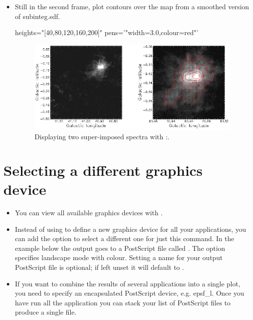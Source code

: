 \documentclass[11pt,oneside,chapters]{starlink}
\begin{document}
\begin{itemize}
\item Still in the second frame, plot contours over the map from a smoothed version of subinteg.sdf.
\begin{terminalv}
  heights="[40,80,120,160,200]" pens='"width=3.0,colour=red"'
\end{terminalv}

\begin{figure}[h!]
\begin{center}
\includegraphics[width=0.8\linewidth]{sc20_display8}
\caption[Displaying two super-imposed spectra with \Kappa:\linplot.]{\label{fig:display8}
  Displaying two super-imposed spectra with \Kappa:\linplot.}
\end{center}
\end{figure}

\end{itemize}

\section{Selecting a different graphics device}

\begin{itemize}
\item You can view all available graphics devices with .
\begin{terminalv}
\end{terminalv}

\item Instead of using  to define a new graphics device
for all your applications, you can add the  option to
select a different one for just this command. In the example below the
output goes to a PostScript file called . The option
 specifies landscape mode with colour. Setting a name
for your output PostScript file is optional; if left unset it will default to
.
\begin{terminalv}
\end{terminalv}

\item If you want to combine the results of several applications into
a single plot, you need to specify an encapsulated PostScript device,
e.g. epsf\_l. Once you have run all the application you can stack your
list of PostScript files to produce a single file.
\begin{terminalv}
\end{terminalv}
\end{itemize}
\end{document}

